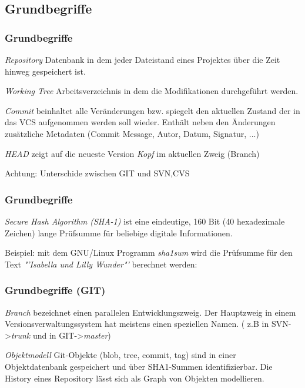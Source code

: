 \documentclass{beamer}
\begin{document}
\subsection{Grundbegriffe}

\begin{frame}\frametitle{Grundbegriffe}
\begin{block}{\textit{Repository}}
Datenbank in dem jeder Dateistand eines Projektes über die Zeit hinweg gespeichert ist.
\end{block}
\begin{block}{\textit{Working Tree}}
Arbeitsverzeichnis in dem die Modifikationen durchgeführt werden.
\end{block}
\begin{block}{\textit{Commit}}
beinhaltet alle Veränderungen bzw. spiegelt den aktuellen Zustand der in das VCS aufgenommen werden soll wieder. Enthält neben den Änderungen zusätzliche Metadaten (Commit Message, Autor, Datum, Signatur, ...)
\end{block}
\begin{block}{\textit{HEAD}}
zeigt auf die neueste Version \textit{Kopf} im aktuellen Zweig (Branch)

Achtung: Unterschide zwischen GIT und SVN,CVS
\end{block}
\end{frame}

\begin{frame}\frametitle{Grundbegriffe}
\begin{block}{\textit{Secure Hash Algorithm (SHA-1)}}
ist eine eindeutige, 160 Bit (40 hexadezimale Zeichen) lange Prüfsumme für beliebige digitale Informationen.
\end{block}
\begin{exampleblock}{Beispiel:}
mit dem GNU/Linux Programm \textit{sha1sum} wird die Prüfsumme für den Text \textit{"'Isabella und Lilly Wunder"'} berechnet werden:

\end{exampleblock}
\end{frame}

\begin{frame}\frametitle{Grundbegriffe (GIT)}
\begin{block}{\textit{Branch}}
bezeichnet einen parallelen Entwicklungszweig. Der Hauptzweig in einem Versionsverwaltungssystem hat meistens einen speziellen Namen. ( z.B in SVN->\textit{trunk} und in GIT->\textit{master})
\end{block}
\begin{block}{\textit{Objektmodell}}
Git-Objekte (blob, tree, commit, tag) sind in einer Objektdatenbank gespeichert und über SHA1-Summen identifizierbar. Die History eines Repository lässt sich als Graph von Objekten modellieren.
\end{block}
\end{frame}
\end{document}
